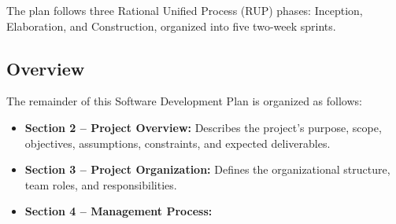 The plan follows three Rational Unified Process (RUP)
phases: Inception, Elaboration, and Construction,
organized into five two-week sprints.



\subsection{Overview}

The remainder of this Software Development Plan
is organized as follows:

\begin{itemize}

    \item \textbf{Section 2 -- Project Overview:}
    Describes the project's purpose, scope,
    objectives, assumptions, constraints,
    and expected deliverables.

    \item \textbf{Section 3 -- Project Organization:}
    Defines the organizational structure,
    team roles, and responsibilities.

    \item \textbf{Section 4 -- Management Process:}

\end{itemize}
